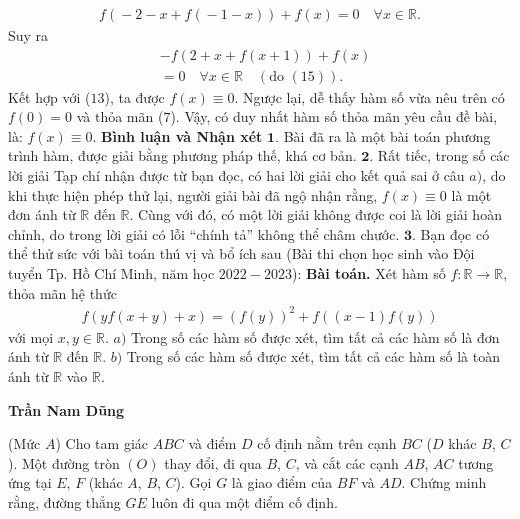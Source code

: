 \begin{multicols}{2}
	\begin{align*}
		f\left( { \!-\! 2 \!-\! x \!+\! f\left( { \!-\! 1 \!-\! x} \right)} \right) \!+\! f\left( x \right) \!=\! 0 \quad\forall x \in \mathbb{R}.
	\end{align*}
	Suy ra
	\begin{align*}
		&-f\left( {2 + x + f\left( {x + 1} \right)} \right) + f\left( x \right) \\
		&= 0 \quad
		\forall x \in \mathbb{R} \quad(\text{do } (15)).
	\end{align*}
	Kết hợp với ($13$), ta được  $f(x) \equiv 0$.
	\vskip 0.05cm
	Ngược lại, dễ thấy hàm số vừa nêu trên có $f(0) = 0$  và thỏa mãn ($7$).
	\vskip 0.05cm
	Vậy, có duy nhất hàm số thỏa mãn yêu cầu đề bài, là: $f(x) \equiv 0$.
	\vskip 0.05cm  
	\textbf{\color{thachthuctoanhoc}Bình luận và Nhận xét}
	\vskip 0.05cm
	$\pmb{1.}$ Bài đã ra là một bài toán phương trình hàm, được giải bằng phương pháp thế, khá cơ bản.
	\vskip 0.05cm
	$\pmb{2.}$ Rất tiếc, trong số các lời giải Tạp chí nhận được từ bạn đọc, có hai lời giải cho kết quả sai ở câu $a)$, do khi thực hiện phép thử lại, người giải bài đã ngộ nhận rằng, $f(x) \equiv 0$  là một đơn ánh từ $\mathbb{R}$  đến  $\mathbb{R}$. Cùng với đó, có một lời giải không được coi là lời giải hoàn chỉnh, do trong lời giải có lỗi “chính tả” không thể châm chước.
	\vskip 0.05cm
	$\pmb{3.}$ Bạn đọc có thể thử sức với bài toán thú vị và bổ ích sau (Bài thi chọn học sinh vào Đội tuyển Tp. Hồ Chí Minh, năm học $2022 - 2023$):
	\vskip 0.05cm
	\textbf{\color{thachthuctoanhoc}Bài toán.} Xét hàm số  $f: \mathbb{R} \to \mathbb{R}$, thỏa mãn hệ thức
	\begin{align*}
		f\left( {yf\left( {x \!+\! y} \right) \!+\! x} \right) \!=\! {\left( {f\left( y \right)} \right)^2} \!+\! f\left( {\left( {x \!-\! 1} \right)f\left( y \right)} \right)
	\end{align*}
	với mọi  $x,y \in \mathbb{R}$.
	\vskip 0.05cm
	$a)$ Trong số các hàm số được xét, tìm tất cả các hàm số là đơn ánh từ $\mathbb{R}$ đến  $\mathbb{R}$.
	\vskip 0.05cm
	$b)$ Trong số các hàm số được xét, tìm tất cả các hàm số là toàn ánh từ $\mathbb{R}$  vào  $\mathbb{R}$.
	\begin{flushright}
		\textbf{\color{thachthuctoanhoc}Trần Nam Dũng}
	\end{flushright}
	{}
	(Mức $A$)
	Cho tam giác $ABC$ và điểm $D$ cố định nằm trên cạnh $BC$ ($D$ khác $B$, $C$). Một đường tròn $(O)$ thay đổi, đi qua $B$, $C$, và cắt các cạnh $AB$, $AC$ tương ứng tại $E$, $F$ (khác $A$, $B$, $C$). Gọi $G$ là giao điểm của $BF$ và $AD$. Chứng minh rằng, đường thẳng $GE$ luôn đi qua một điểm cố định.

\end{multicols}
